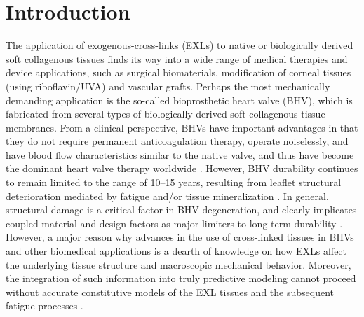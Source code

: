 \section{Introduction}

    The application of exogenous-cross-links (EXLs) to native or biologically derived soft collagenous tissues finds its way into a wide range of medical therapies and device applications, such as surgical biomaterials, modification of corneal tissues (using riboflavin/UVA) and vascular grafts. Perhaps the most mechanically demanding application is the so-called bioprosthetic heart valve (BHV), which is fabricated from several types of biologically derived soft collagenous tissue membranes. From a clinical perspective, BHVs have important advantages in that they do not require permanent anticoagulation therapy, operate noiselessly, and have blood flow characteristics similar to the native valve, and thus have become the dominant heart valve therapy worldwide \cite{bini_noncollagenous_1999,schoen_cardiac_2005,schoen_founders_1999}. However, BHV durability continues to remain limited to the range of 10–15 years, resulting from leaflet structural deterioration mediated by fatigue and/or tissue mineralization \cite{vesely_tissue_2001,sacks_collagen_2002}. In general, structural damage is a critical factor in BHV degeneration, and clearly implicates coupled material and design factors as major limiters to long-term durability \cite{schoen_calcification_2005,schoen_pathology_2001}. However, a major reason why advances in the use of cross-linked tissues in BHVs and other biomedical applications is a dearth of knowledge on how EXLs affect the underlying tissue structure and macroscopic mechanical behavior. Moreover, the integration of such information into truly predictive modeling cannot proceed without accurate constitutive models of the EXL tissues and the subsequent fatigue processes \cite{sacks_incorporation_2003,sun_finite_2005}.


